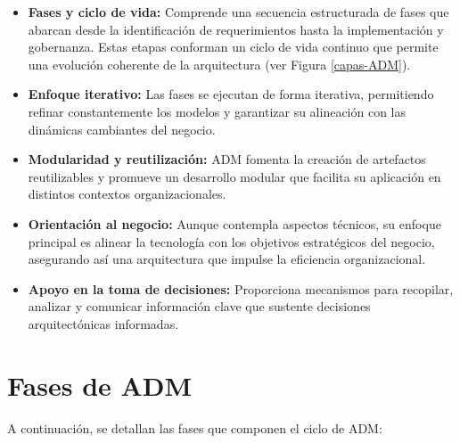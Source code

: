 \begin{itemize}
	\item \textbf{Fases y ciclo de vida:} Comprende una secuencia estructurada de fases que abarcan desde la identificación de requerimientos hasta la implementación y gobernanza. Estas etapas conforman un ciclo de vida continuo que permite una evolución coherente de la arquitectura (ver Figura \ref{capas-ADM}).
	
	\item \textbf{Enfoque iterativo:} Las fases se ejecutan de forma iterativa, permitiendo refinar constantemente los modelos y garantizar su alineación con las dinámicas cambiantes del negocio.
	
	\item \textbf{Modularidad y reutilización:} ADM fomenta la creación de artefactos reutilizables y promueve un desarrollo modular que facilita su aplicación en distintos contextos organizacionales.
	
	\item \textbf{Orientación al negocio:} Aunque contempla aspectos técnicos, su enfoque principal es alinear la tecnología con los objetivos estratégicos del negocio, asegurando así una arquitectura que impulse la eficiencia organizacional.
	
	\item \textbf{Apoyo en la toma de decisiones:} Proporciona mecanismos para recopilar, analizar y comunicar información clave que sustente decisiones arquitectónicas informadas.
\end{itemize}

\section{Fases de ADM}
A continuación, se detallan las fases que componen el ciclo de ADM:

